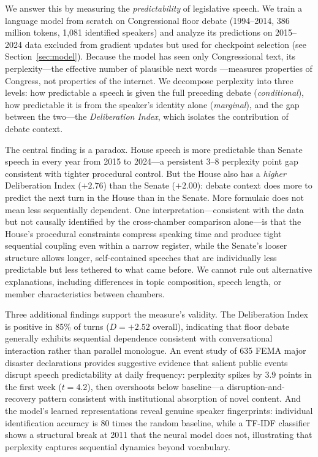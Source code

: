 \documentclass[12pt]{article}
\newcommand{\DI}{\mathit{D}}
\begin{document}
We answer this by measuring the \textit{predictability} of legislative speech. We train a language model from scratch on Congressional floor debate (1994--2014, 386 million tokens, 1,081 identified speakers) and analyze its predictions on 2015--2024 data excluded from gradient updates but used for checkpoint selection (see Section~\ref{sec:model}). Because the model has seen only Congressional text, its perplexity---the effective number of plausible next words \citep{shannon1948}---measures properties of Congress, not properties of the internet. We decompose perplexity into three levels: how predictable a speech is given the full preceding debate (\textit{conditional}), how predictable it is from the speaker's identity alone (\textit{marginal}), and the gap between the two---the \textit{Deliberation Index}, which isolates the contribution of debate context.

The central finding is a paradox. House speech is more predictable than Senate speech in every year from 2015 to 2024---a persistent 3--8 perplexity point gap consistent with tighter procedural control. But the House also has a \textit{higher} Deliberation Index ($+2.76$) than the Senate ($+2.00$): debate context does more to predict the next turn in the House than in the Senate. More formulaic does not mean less sequentially dependent. One interpretation---consistent with the data but not causally identified by the cross-chamber comparison alone---is that the House's procedural constraints compress speaking time and produce tight sequential coupling even within a narrow register, while the Senate's looser structure allows longer, self-contained speeches that are individually less predictable but less tethered to what came before. We cannot rule out alternative explanations, including differences in topic composition, speech length, or member characteristics between chambers.

Three additional findings support the measure's validity. The Deliberation Index is positive in 85\% of turns ($\DI = +2.52$ overall), indicating that floor debate generally exhibits sequential dependence consistent with conversational interaction rather than parallel monologue. An event study of 635 FEMA major disaster declarations provides suggestive evidence that salient public events disrupt speech predictability at daily frequency: perplexity spikes by 3.9 points in the first week ($t = 4.2$), then overshoots below baseline---a disruption-and-recovery pattern consistent with institutional absorption of novel content. And the model's learned representations reveal genuine speaker fingerprints: individual identification accuracy is 80 times the random baseline, while a TF-IDF classifier shows a structural break at 2011 that the neural model does not, illustrating that perplexity captures sequential dynamics beyond vocabulary.
\end{document}
